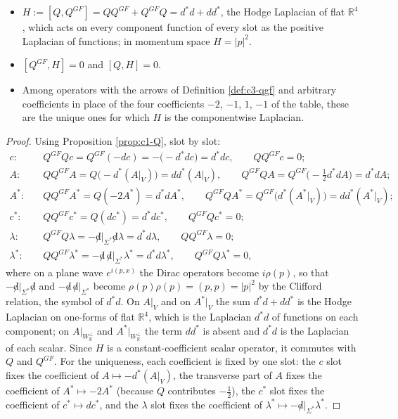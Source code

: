 \begin{proposition}
\label{prop:c3-H}
\begin{itemize}
\item $H:=[Q,Q^{GF}]=QQ^{GF}+Q^{GF}Q=d^*d+dd^*$, the Hodge Laplacian of flat $\mathbb R^4$, which acts on every component function of every slot as the positive Laplacian of functions; in momentum space $H=|p|^2$.
\item $[Q^{GF},H]=0$ and $[Q,H]=0$.
\item Among operators with the arrows of Definition \ref{def:c3-qgf} and arbitrary coefficients in place of the four coefficients $-2$, $-1$, $1$, $-1$ of the table, these are the unique ones for which $H$ is the componentwise Laplacian.
\end{itemize}
\end{proposition}

\begin{proof}
Using Proposition \ref{prop:c1-Q}, slot by slot:
\[
\begin{aligned}
c:&\quad Q^{GF}Qc=Q^{GF}(-dc)=-\big(-d^*dc\big)=d^*dc,\qquad QQ^{GF}c=0;\\
A:&\quad QQ^{GF}A=Q\big(-d^*(A|_V)\big)=dd^*(A|_V),\qquad Q^{GF}QA=Q^{GF}\big(-\tfrac12d^*dA\big)=d^*dA;\\
A^*:&\quad QQ^{GF}A^*=Q(-2A^*)=d^*dA^*,\qquad Q^{GF}QA^*=Q^{GF}\big(d^*(A^*|_V)\big)=dd^*(A^*|_V);\\
c^*:&\quad QQ^{GF}c^*=Q(dc^*)=d^*dc^*,\qquad Q^{GF}Qc^*=0;\\
\lambda:&\quad Q^{GF}Q\lambda=-{\not d}|_{\Sigma^*}{\not d}\lambda=d^*d\lambda,\qquad QQ^{GF}\lambda=0;\\
\lambda^*:&\quad QQ^{GF}\lambda^*=-{\not d}\,{\not d}|_{\Sigma^*}\lambda^*=d^*d\lambda^*,\qquad Q^{GF}Q\lambda^*=0,
\end{aligned}
\]
where on a plane wave $e^{i(p,x)}$ the Dirac operators become $i\rho(p)$, so that $-{\not d}|_{\Sigma^*}{\not d}$ and $-{\not d}\,{\not d}|_{\Sigma^*}$ become $\rho(p)\rho(p)=(p,p)=|p|^2$ by the Clifford relation, the symbol of $d^*d$. On $A|_V$ and on $A^*|_V$ the sum $d^*d+dd^*$ is the Hodge Laplacian on one-forms of flat $\mathbb R^4$, which is the Laplacian $d^*d$ of functions on each component; on $A|_{W_{\mathbb R}^\perp}$ and $A^*|_{W_{\mathbb R}^\perp}$ the term $dd^*$ is absent and $d^*d$ is the Laplacian of each scalar. Since $H$ is a constant-coefficient scalar operator, it commutes with $Q$ and $Q^{GF}$. For the uniqueness, each coefficient is fixed by one slot: the $c$ slot fixes the coefficient of $A\mapsto-d^*(A|_V)$, the transverse part of $A$ fixes the coefficient of $A^*\mapsto-2A^*$ (because $Q$ contributes $-\tfrac12$), the $c^*$ slot fixes the coefficient of $c^*\mapsto dc^*$, and the $\lambda$ slot fixes the coefficient of $\lambda^*\mapsto-{\not d}|_{\Sigma^*}\lambda^*$.
\end{proof}

